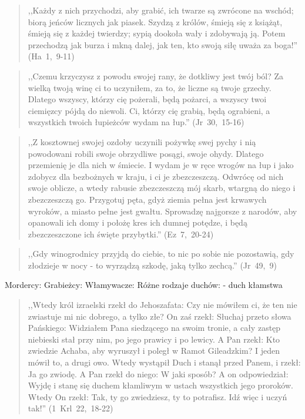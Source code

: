 \documentclass[10pt,a4paper,oneside]{article}
\begin{document}
\begin{quote}
,,Każdy z nich przychodzi, aby grabić, ich twarze są zwrócone na wschód; biorą jeńców licznych jak piasek. Szydzą z królów, śmieją się z książąt, śmieją się z każdej twierdzy; sypią dookoła wały i zdobywają ją. Potem przechodzą jak burza i mkną dalej, jak ten, kto swoją siłę uważa za boga!'' \mbox{(Ha 1, 9-11)}
\end{quote}
\begin{quote}
,,Czemu krzyczysz z powodu swojej rany, że dotkliwy jest twój ból? Za wielką twoją winę ci to uczyniłem, za to, że liczne są twoje grzechy. Dlatego wszyscy, którzy cię pożerali, będą pożarci, a wszyscy twoi ciemięzcy pójdą do niewoli. Ci, którzy cię grabią, będą ograbieni, a wszystkich twoich łupieżców wydam na łup.'' \mbox{(Jr 30, 15-16)}
\end{quote}
\begin{quote}
,,Z kosztownej swojej ozdoby uczynili pożywkę swej pychy i nią powodowani robili swoje obrzydliwe posągi, swoje ohydy. Dlatego przemienię je dla nich w śmiecie. I wydam je w ręce wrogów na łup i jako zdobycz dla bezbożnych w kraju, i ci je zbezczeszczą. Odwrócę od nich swoje oblicze, a wtedy rabusie zbezczeszczą mój skarb, wtargną do niego i zbezczeszczą go. Przygotuj pęta, gdyż ziemia pełna jest krwawych wyroków, a miasto pełne jest gwałtu. Sprowadzę najgorsze z narodów, aby opanowali ich domy i położę kres ich dumnej potędze, i będą zbezczeszczone ich święte przybytki.'' \mbox{(Ez 7, 20-24)}
\end{quote}
\begin{quote}
,,Gdy winogrodnicy przyjdą do ciebie, to nic po sobie nie pozostawią, gdy złodzieje w nocy - to wyrządzą szkodę, jaką tylko zechcą.'' \mbox{(Jr 49, 9)}
\end{quote}
Mordercy:
Grabieżcy:
Włamywacze:
Różne rodzaje duchów:
- duch kłamstwa
\begin{quote}
,,Wtedy król izraelski rzekł do Jehoszafata: Czy nie mówiłem ci, że ten nie zwiastuje mi nic dobrego, a tylko złe? On zaś rzekł: Słuchaj przeto słowa Pańskiego: Widziałem Pana siedzącego na swoim tronie, a cały zastęp niebieski stał przy nim, po jego prawicy i po lewicy. A Pan rzekł: Kto zwiedzie Achaba, aby wyruszył i poległ w Ramot Gileadzkim? I jeden mówił to, a drugi owo. Wtedy wystąpił Duch i stanął przed Panem, i rzekł: Ja go zwiodę. A Pan rzekł do niego: W jaki sposób? A on odpowiedział: Wyjdę i stanę się duchem kłamliwym w ustach wszystkich jego proroków. Wtedy On rzekł: Tak, ty go zwiedziesz, ty to potrafisz. Idź więc i uczyń tak!'' \mbox{(1 Krl 22, 18-22)}
\end{quote}
\end{document}
